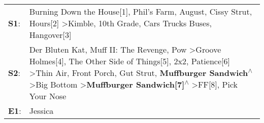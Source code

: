 \begin{supertabular}{p{0.03\textwidth}p{0.92\textwidth}}
 \textbf{S1}:  &                                                                                                                                                                                                                                                                                                                                                         Burning Down the House[1]\textsuperscript{}, \enspace Phil's Farm\textsuperscript{}, \enspace August\textsuperscript{}, \enspace Cissy Strut\textsuperscript{}, \enspace Hours[2]\textsuperscript{} \textgreater \enspace Kimble\textsuperscript{}, \enspace 10th Grade\textsuperscript{}, \enspace Cars Trucks Buses\textsuperscript{}, \enspace Hangover[3]\textsuperscript{}  \enspace  \\
 \textbf{S2}:  &  Der Bluten Kat\textsuperscript{}, \enspace Muff II: The Revenge\textsuperscript{}, \enspace Pow\textsuperscript{} \textgreater \enspace Groove Holmes[4]\textsuperscript{}, \enspace The Other Side of Things[5]\textsuperscript{}, \enspace 2x2\textsuperscript{}, \enspace Patience[6]\textsuperscript{} \textgreater \enspace Thin Air\textsuperscript{}, \enspace Front Porch\textsuperscript{}, \enspace Gut Strut\textsuperscript{}, \enspace \textbf{Muffburger Sandwich\textsuperscript{$\wedge$}} \textgreater \enspace Big Bottom\textsuperscript{} \textgreater \enspace \textbf{Muffburger Sandwich[7]\textsuperscript{$\wedge$}} \textgreater \enspace FF[8]\textsuperscript{}, \enspace Pick Your Nose\textsuperscript{}  \enspace  \\
 \textbf{E1}:  &                                                                                                                                                                                                                                                                                                                                                                                                                                                                                                                                                                                                                                                                                                               Jessica\textsuperscript{}  \enspace  \\
\end{supertabular}
